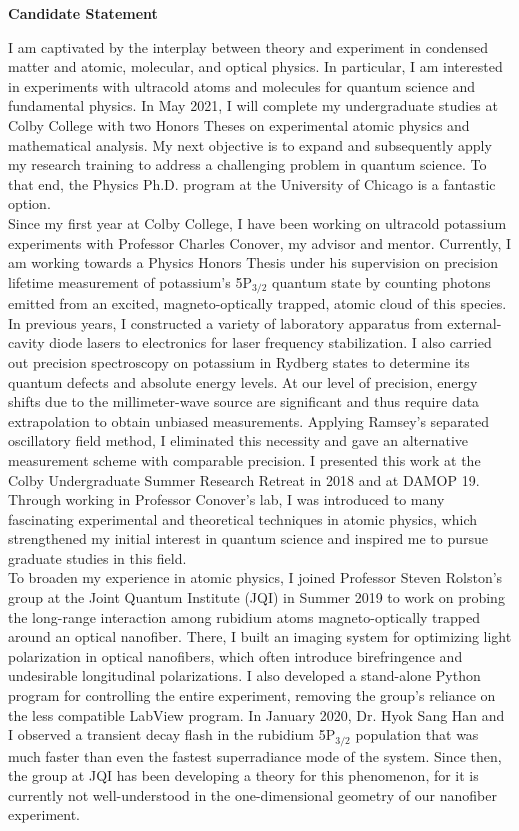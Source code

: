 \documentclass[12pt]{article}
\begin{document}
\begin{center}
	\textbf{Candidate Statement}
\end{center}
I am captivated by the interplay between theory and experiment in condensed matter and atomic, molecular, and optical physics. In particular, I am interested in experiments with ultracold atoms and molecules for quantum science and fundamental physics. In May 2021, I will complete my undergraduate studies at Colby College with two Honors Theses on experimental atomic physics and mathematical analysis. My next objective is to expand and subsequently apply my research training to address a challenging problem in quantum science. To that end, the Physics Ph.D. program at the University of Chicago is a fantastic option.  \\ 

Since my first year at Colby College, I have been working on ultracold potassium experiments with Professor Charles Conover, my advisor and mentor. Currently, I am working towards a Physics Honors Thesis under his supervision on precision lifetime measurement of potassium's 5P$_{\text{3/2}}$ quantum state by counting photons emitted from an excited, magneto-optically trapped, atomic cloud of this species. In previous years, I constructed a variety of laboratory apparatus from external-cavity diode lasers to electronics for laser frequency stabilization. I also carried out precision spectroscopy on potassium in Rydberg states to determine its quantum defects and absolute energy levels. At our level of precision, energy shifts due to the millimeter-wave source are significant and thus require data extrapolation to obtain unbiased measurements. Applying Ramsey's separated oscillatory field method, I eliminated this necessity and gave an alternative measurement scheme with comparable precision. I presented this work at the Colby Undergraduate Summer Research Retreat in 2018 and at DAMOP 19. Through working in Professor Conover's lab, I was introduced to many fascinating experimental and theoretical techniques in atomic physics, which strengthened my initial interest in quantum science and inspired me to pursue graduate studies in this field.  \\


To broaden my experience in atomic physics, I joined Professor Steven Rolston's group at the Joint Quantum Institute (JQI) in Summer 2019 to work on probing the long-range interaction among rubidium atoms magneto-optically trapped around an optical nanofiber. There, I built an imaging system for optimizing light polarization in optical nanofibers, which often introduce birefringence and undesirable longitudinal polarizations. I also developed a stand-alone Python program for controlling the entire experiment, removing the group's reliance on the less compatible LabView program. In January 2020, Dr. Hyok Sang Han and I observed a transient decay flash in the rubidium 5P$_{\text{3/2}}$ population that was much faster than even the fastest superradiance mode of the system.  Since then, the group at JQI has been developing a theory for this phenomenon, for it is currently not well-understood in the one-dimensional geometry of our nanofiber experiment. \\ 
\end{document}
